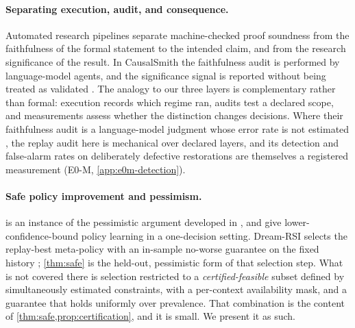 \paragraph{Separating execution, audit, and consequence.}
Automated research pipelines separate machine-checked proof soundness from the
faithfulness of the formal statement to the intended claim, and from the
research significance of the result.  In CausalSmith the faithfulness audit is
performed by language-model agents, and the significance signal is reported
without being treated as validated \citep[Secs.~5.1--5.3]{causalforge2026}.  The
analogy to our three layers is complementary rather than formal: execution
records which regime ran, audits test a declared scope, and measurements assess
whether the distinction changes decisions.  Where their faithfulness audit is a
language-model judgment whose error rate is not estimated \citep[Sec.~7]{causalforge2026},
the replay audit here is mechanical over declared layers, and its detection and
false-alarm rates on deliberately defective restorations are themselves a
registered measurement (E0-M, \cref{app:e0m-detection}).

\paragraph{Safe policy improvement and pessimism.}
 is an instance of the pessimistic argument developed in
\citet{laroche2019,kumar2020,xie2021}, and \citet{limasrebro2022} give
lower-confidence-bound policy learning in a one-decision setting.  Dream-RSI
selects the replay-best meta-policy with an in-sample no-worse guarantee on the
fixed history \citep{dreamrsi2026}; \cref{thm:safe} is the held-out, pessimistic
form of that selection step.  What is not
covered there is selection restricted to a \emph{certified-feasible} subset
defined by simultaneously estimated constraints, with a per-context availability
mask, and a guarantee that holds uniformly over prevalence.  That
combination is the content of \cref{thm:safe,prop:certification}, and it is
small.  We present it as such.

